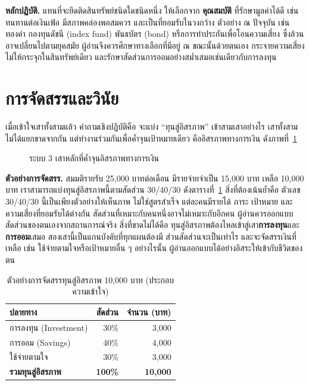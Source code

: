 \documentclass[14pt,a4paper,twocolumn]{extarticle}
\begin{document}
\textbf{หลักปฏิบัติ.} แทนที่จะยึดติดสินทรัพย์ชนิดใดชนิดหนึ่ง ให้เลือกจาก \textbf{คุณสมบัติ} ที่รักษามูลค่าได้ดี เช่น ทนทานต่อเงินเฟ้อ มีสภาพคล่องพอสมควร และเป็นที่ยอมรับในวงกว้าง ตัวอย่าง ณ ปัจจุบัน เช่น ทองคำ กองทุนดัชนี (index fund) พันธบัตร (bond) หรือการทำประกันเพื่อโอนความเสี่ยง ซึ่งล้วนอาจเปลี่ยนไปตามยุคสมัย ผู้อ่านจึงควรศึกษาทางเลือกที่มีอยู่ ณ ขณะนั้นด้วยตนเอง กระจายความเสี่ยงไม่ให้กระจุกในสินทรัพย์เดียว และรักษาสัดส่วนการออมอย่างสม่ำเสมอเช่นเดียวกับการลงทุน

\section{การจัดสรรและวินัย}
เมื่อเข้าใจเสาทั้งสามแล้ว คำถามเชิงปฏิบัติคือ จะแบ่ง “ทุนสู่อิสรภาพ” เข้าสามเสาอย่างไร เสาทั้งสามไม่ได้แยกขาดจากกัน แต่ทำงานร่วมกันเพื่อค้ำจุนเป้าหมายเดียว คืออิสรภาพทางการเงิน ดังภาพที่~\ref{fig:pillars}

\begin{figure}[t]
\centering
{}
\caption{ระบบ 3 เสาหลักที่ค้ำจุนอิสรภาพทางการเงิน}
\label{fig:pillars}
\end{figure}

\textbf{ตัวอย่างการจัดสรร.} สมมติรายรับ 25{,}000 บาทต่อเดือน มีรายจ่ายจำเป็น 15{,}000 บาท เหลือ 10{,}000 บาท เราสามารถแบ่งทุนสู่อิสรภาพนี้ตามสัดส่วน 30/40/30 ดังตารางที่~\ref{tab:alloc} สิ่งที่ต้องเน้นย้ำคือ ตัวเลข 30/40/30 นี้เป็นเพียงตัวอย่างให้เห็นภาพ ไม่ใช่สูตรสำเร็จ แต่ละคนมีรายได้ ภาระ เป้าหมาย และความเสี่ยงที่ยอมรับได้ต่างกัน สัดส่วนที่เหมาะกับคนหนึ่งอาจไม่เหมาะกับอีกคน ผู้อ่านควรออกแบบสัดส่วนของตนเองจากสถานการณ์จริง สิ่งที่ขาดไม่ได้คือ ทุนสู่อิสรภาพต้องไหลเข้าสู่เสา\textbf{การลงทุน}และ\textbf{การออม}เสมอ สองเสานี้เป็นแกนบังคับที่ทุกแผนต้องมี ส่วนสัดส่วนจะเป็นเท่าไร และจะจัดสรรเงินที่เหลือ เช่น ใช้จ่ายตามใจหรือเป้าหมายอื่น ๆ อย่างไรนั้น ผู้อ่านออกแบบได้อย่างอิสระให้เข้ากับชีวิตของตน

\begin{table}[t]
\centering
\small
\begin{tabular}{lrr}
\toprule
\rowcolor{accent!15}
\textbf{ปลายทาง} & \textbf{สัดส่วน} & \textbf{จำนวน (บาท)} \\
\midrule
การลงทุน (Investment) & 30\% & 3{,}000 \\
การออม (Savings)      & 40\% & 4{,}000 \\
ใช้จ่ายตามใจ          & 30\% & 3{,}000 \\
\midrule
\textbf{รวมทุนสู่อิสรภาพ} & \textbf{100\%} & \textbf{10{,}000} \\
\bottomrule
\end{tabular}
\caption{ตัวอย่างการจัดสรรทุนสู่อิสรภาพ 10{,}000 บาท (ประกอบความเข้าใจ)}
\label{tab:alloc}
\end{table}
\end{document}
